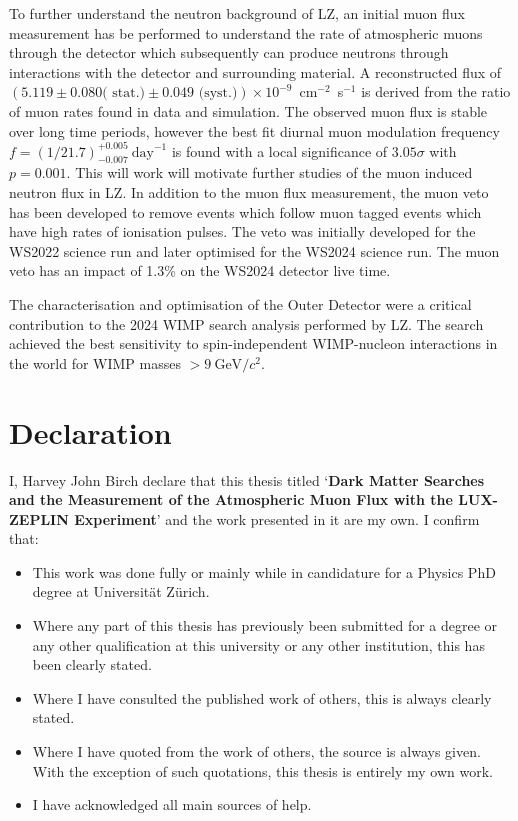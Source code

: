 \documentclass[a4paper,11pt,usegeometry]{scrreprt} %
\begin{document}
To further understand the neutron background of LZ, an initial muon flux measurement has be performed to understand the rate of atmospheric muons through the detector which subsequently can produce neutrons through interactions with the detector and surrounding material. A reconstructed flux of $(5.119 \pm 0.080 \textrm{( stat.)} \pm 0.049 \textrm{ (syst.)})\times10^{-9}$~cm$^{-2}$~s$^{-1}$ is derived from the ratio of muon rates found in data and simulation. The observed muon flux is stable over long time periods, however the best fit diurnal muon modulation frequency $f=(1/21.7)^{+0.005}_{-0.007}~\text{day}^{-1}$ is found with a local significance of $3.05\sigma$ with $p=0.001$. This will work will motivate further studies of the muon induced neutron flux in LZ.
In addition to the muon flux measurement, the muon veto has been developed to remove events which follow muon tagged events which have high rates of ionisation pulses. The veto was initially developed for the WS2022 science run and later optimised for the WS2024 science run. The muon veto has an impact of 1.3\% on the WS2024 detector live time. 

The characterisation and optimisation of the Outer Detector were a critical contribution to the 2024 WIMP search analysis performed by LZ. The search achieved the best sensitivity to spin-independent WIMP-nucleon interactions in the world for WIMP masses $>9~\text{GeV}/c^2$.

\newpage\null\thispagestyle{empty}\newpage

\chapter*{Declaration}
\vskip 1in
I, Harvey John Birch declare that this thesis titled ‘\textbf{Dark Matter Searches and the Measurement of the Atmospheric Muon Flux with the LUX-ZEPLIN Experiment}’ and the work presented in it are my own. I confirm that:
\bigbreak

\begin{itemize}
\item This work was done fully or mainly while in candidature for a Physics PhD degree at Universit\"at Z\"urich.
\item Where any part of this thesis has previously been submitted for a degree or any other qualification at this university or any other institution, this has been clearly stated.
\item Where I have consulted the published work of others, this is always clearly stated.
\item Where I have quoted from the work of others, the source is always given. With the exception of such quotations, this thesis is entirely my own work.
\item I have acknowledged all main sources of help.
\end{itemize}
\vskip 2in
\end{document}
